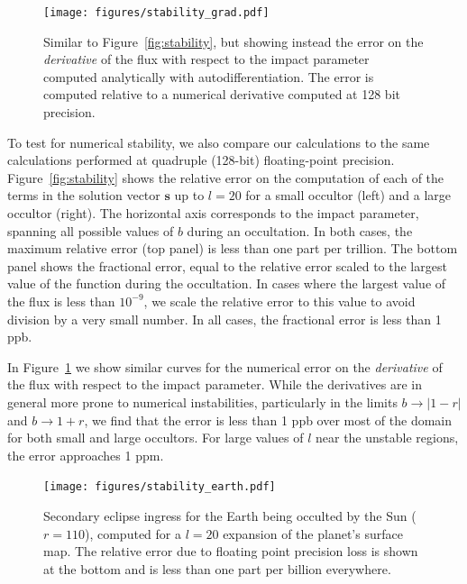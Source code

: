 \documentclass[modern]{aastex61}
\begin{document}
\begin{figure}[p!]
    \begin{centering}
    \texttt{[image: figures/stability\_grad.pdf]}
    \caption{\label{fig:stability_grad}
             Similar to Figure~\ref{fig:stability}, but showing instead the
             error on the \emph{derivative} of the flux with respect to the impact
             parameter computed analytically with autodifferentiation. The error is computed
             relative to a numerical derivative computed at 128 bit precision.
             }
    \end{centering}
\end{figure}

To test for numerical stability, we also compare our calculations to
the same calculations performed at quadruple (128-bit) floating-point precision.
Figure~\ref{fig:stability} shows the relative error on the computation of each of the
terms in the solution vector $\mathbf{s}$ up to $l = 20$ for a small occultor (left)
and a large occultor (right). The horizontal axis corresponds to the impact
parameter, spanning all possible values of $b$ during an occultation.
In both cases, the maximum relative error (top panel) is less than one part per
trillion. The bottom panel shows the fractional error, equal to the relative
error scaled to the largest value of the function during the occultation. In cases
where the largest value of the flux is less than $10^{-9}$, we scale the relative
error to this value to avoid division by a very small number. In all cases, the
fractional error is less than 1 ppb.

In Figure~\ref{fig:stability_grad} we show similar curves for the numerical error
on the \emph{derivative} of the flux with respect to the impact parameter. While
the derivatives are in general more prone to numerical instabilities, particularly in the
limits $b \rightarrow |1 - r|$ and $b \rightarrow 1 + r$, we find that the error
is less than 1 ppb over most of the domain for both small and large occultors. For
large values of $l$ near the unstable regions, the error approaches 1 ppm.

\begin{figure}[t!]
    \begin{centering}
    \texttt{[image: figures/stability\_earth.pdf]}
    \caption{\label{fig:stability_earth}
             Secondary eclipse ingress for the Earth being occulted by the Sun
             ($r = 110$), computed for a $l = 20$ expansion of the planet's
             surface map. The relative error due to floating point precision loss
             is shown at the bottom and is
             less than one part per billion everywhere.
             }
    \end{centering}
\end{figure}
\end{document}
